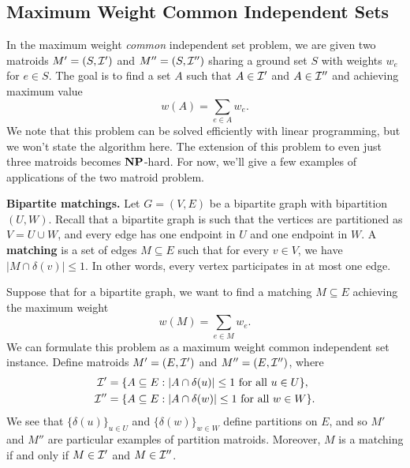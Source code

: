 \subsection{Maximum Weight Common Independent Sets} \label{subsec:4.3}
In the maximum weight \emph{common} independent set problem, we are given 
two matroids $M' = (S, {\cal I}')$ and $M'' = (S, {\cal I}'')$ sharing a 
ground set $S$ with weights $w_e$ for $e \in S$. The goal is to find 
a set $A$ such that $A \in {\cal I}'$ and $A \in {\cal I}''$ and 
achieving maximum value 
\[ w(A) = \sum_{e\in A} w_e. \] 
We note that this problem can be solved efficiently with linear programming, 
but we won't state the algorithm here. The extension of this problem 
to even just three matroids becomes $\mathbf{NP}$-hard. For now, we'll give a few 
examples of applications of the two matroid problem. 

{\bf Bipartite matchings.} Let $G = (V, E)$ be a bipartite graph with 
bipartition $(U, W)$. Recall that a bipartite graph is such that 
the vertices are partitioned as $V = U \cup W$, and every edge has 
one endpoint in $U$ and one endpoint in $W$. A {\bf matching} is a set 
of edges $M \subseteq E$ such that for every $v \in V$, we have 
$|M \cap \delta(v)| \leq 1$. In other words, every vertex participates 
in at most one edge. 

Suppose that for a bipartite graph, we want to find a matching $M \subseteq E$
achieving the maximum weight
\[ w(M) = \sum_{e\in M} w_e. \] 
We can formulate this problem as a maximum weight common independent set instance. 
Define matroids $M' = (E, {\cal I}')$ and $M'' = (E, {\cal I}'')$, where 
\begin{align*}
    {\cal I}' &= \{A \subseteq E : |A \cap \delta(u)| \leq 1 \text{ for all } u \in U\}, \\ 
    {\cal I}'' &= \{A \subseteq E : |A \cap \delta(w)| \leq 1 \text{ for all } w \in W\}.
\end{align*}
We see that $\{\delta(u)\}_{u\in U}$ and $\{\delta(w)\}_{w\in W}$ define 
partitions on $E$, and so $M'$ and $M''$ are particular examples of partition 
matroids. Moreover, $M$ is a matching if and only if $M \in {\cal I}'$ and 
$M \in {\cal I}''$. 

